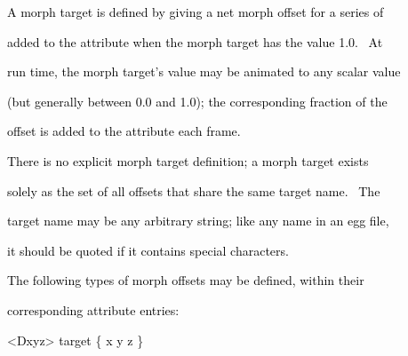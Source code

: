 \documentclass[a4paper]{article}
\newcommand\textstyleOOoComputerKeyWord[1]{\textrm{\textcolor[rgb]{0.0,0.0,0.5019608}{#1}}}
\newcommand\textstyleOOoAssemblerSpecialChar[1]{\textrm{\textcolor[rgb]{0.0,0.5019608,0.0}{#1}}}
\newcommand\textstyleOOoAssemblerIdent[1]{\textrm{\textcolor{black}{#1}}}
\begin{document}
\bigskip

{\color{black}
\textstyleOOoComputerKeyWord{\textcolor{black}{A morph target is defined by giving a net morph offset for a series of}}}

\clearpage{\color{black}
\textstyleOOoComputerKeyWord{\textcolor{black}{vertex or polygon attributes; this offset is the value that will be}}}

{\color{black}
\textstyleOOoComputerKeyWord{\textcolor{black}{added to the attribute when the morph target has the value 1.0. \ At}}}

{\color{black}
\textstyleOOoComputerKeyWord{\textcolor{black}{run time, the morph target's value may be animated to any scalar value}}}

{\color{black}
\textstyleOOoComputerKeyWord{\textcolor{black}{(but generally between 0.0 and 1.0); the corresponding fraction of the}}}

{\color{black}
\textstyleOOoComputerKeyWord{\textcolor{black}{offset is added to the attribute each frame.}}}


\bigskip

{\color{black}
\textstyleOOoComputerKeyWord{\textcolor{black}{There is no explicit morph target definition; a morph target exists}}}

{\color{black}
\textstyleOOoComputerKeyWord{\textcolor{black}{solely as the set of all offsets that share the same target name.
\ The}}}

{\color{black}
\textstyleOOoComputerKeyWord{\textcolor{black}{target name may be any arbitrary string; like any name in an egg file,}}}

{\color{black}
\textstyleOOoComputerKeyWord{\textcolor{black}{it should be quoted if it contains special characters.}}}


\bigskip

{\color{black}
\textstyleOOoComputerKeyWord{\textcolor{black}{The following types of morph offsets may be defined, within their}}}

{\color{black}
\textstyleOOoComputerKeyWord{\textcolor{black}{corresponding attribute entries:}}}


\bigskip

{\color{black}
\textstyleOOoAssemblerSpecialChar{{\textless}}\textstyleOOoAssemblerIdent{Dxyz}\textstyleOOoAssemblerSpecialChar{{\textgreater}}\textstyleOOoComputerKeyWord{\textcolor{black}{
}}\textstyleOOoAssemblerIdent{target}\textstyleOOoComputerKeyWord{\textcolor{black}{
}}\textstyleOOoAssemblerSpecialChar{\{}\textstyleOOoComputerKeyWord{\textcolor{black}{
}}\textstyleOOoAssemblerIdent{x}\textstyleOOoComputerKeyWord{\textcolor{black}{
}}\textstyleOOoAssemblerIdent{y}\textstyleOOoComputerKeyWord{\textcolor{black}{
}}\textstyleOOoAssemblerIdent{z}\textstyleOOoComputerKeyWord{\textcolor{black}{
}}\textstyleOOoAssemblerSpecialChar{\}}}
\end{document}

